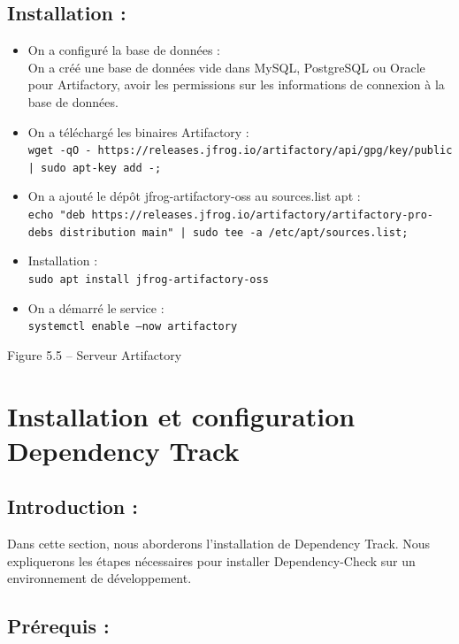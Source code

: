 \subsection*{Installation :}

\begin{itemize}
\item On a configuré la base de données : \\
On a créé une base de données vide dans MySQL, PostgreSQL ou Oracle pour Artifactory, avoir les permissions sur les informations de connexion à la base de données.

\item On a téléchargé les binaires Artifactory : \\
\texttt{wget -qO - https://releases.jfrog.io/artifactory/api/gpg/key/public | sudo apt-key add -;}

\item On a ajouté le dépôt jfrog-artifactory-oss au sources.list apt : \\
\texttt{echo "deb https://releases.jfrog.io/artifactory/artifactory-pro-debs distribution main" | sudo tee -a /etc/apt/sources.list;}

\item Installation : \\
\texttt{sudo apt install jfrog-artifactory-oss}

\item On a démarré le service : \\
\texttt{systemctl enable --now artifactory}
\end{itemize}

\begin{center}
Figure 5.5 – Serveur Artifactory
\end{center}
\section*{Installation et configuration Dependency Track}

\subsection*{Introduction :}

Dans cette section, nous aborderons l’installation de Dependency Track. Nous expliquerons les étapes nécessaires pour installer Dependency-Check sur un environnement de développement.

\subsection*{Prérequis :}

